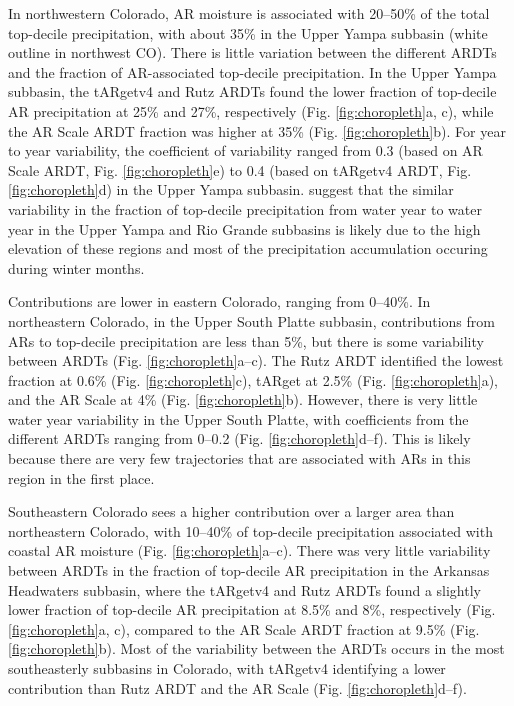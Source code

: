 \documentclass[draft]{agujournal2019}
\begin{document}
In northwestern Colorado, AR moisture is associated with 20--50\% of the total top-decile precipitation, with about 35\% in the Upper Yampa subbasin (white outline in northwest CO). There is little variation between the different ARDTs and the fraction of AR-associated top-decile precipitation. In the Upper Yampa subbasin, the tARgetv4 and Rutz ARDTs found the lower fraction of top-decile AR precipitation at 25\% and 27\%, respectively (Fig. \ref{fig:choropleth}a, c), while the AR Scale ARDT fraction was higher at 35\% (Fig. \ref{fig:choropleth}b). For year to year variability, the coefficient of variability ranged from 0.3 (based on AR Scale ARDT, Fig. \ref{fig:choropleth}e) to 0.4 (based on tARgetv4 ARDT, Fig. \ref{fig:choropleth}d) in the Upper Yampa subbasin.  suggest that the similar variability in the fraction of top-decile precipitation from water year to water year in the Upper Yampa and Rio Grande subbasins is likely due to the high elevation of these regions and most of the precipitation accumulation occuring during winter months. 

Contributions are lower in eastern Colorado, ranging from 0--40\%. In northeastern Colorado, in the Upper South Platte subbasin, contributions from ARs to top-decile precipitation are less than 5\%, but there is some variability between ARDTs (Fig. \ref{fig:choropleth}a--c). The Rutz ARDT identified the lowest fraction at 0.6\% (Fig. \ref{fig:choropleth}c), tARget at 2.5\% (Fig. \ref{fig:choropleth}a), and the AR Scale at 4\% (Fig. \ref{fig:choropleth}b). However, there is very little water year variability in the Upper South Platte, with coefficients from the different ARDTs ranging from 0--0.2 (Fig. \ref{fig:choropleth}d--f). This is likely because there are very few trajectories that are associated with ARs in this region in the first place. 

Southeastern Colorado sees a higher contribution over a larger area than northeastern Colorado, with 10--40\% of top-decile precipitation associated with coastal AR moisture (Fig. \ref{fig:choropleth}a--c). There was very little variability between ARDTs in the fraction of top-decile AR precipitation in the Arkansas Headwaters subbasin, where the tARgetv4 and Rutz ARDTs found a slightly lower fraction of top-decile AR precipitation at 8.5\% and 8\%, respectively (Fig. \ref{fig:choropleth}a, c), compared to the AR Scale ARDT fraction at 9.5\% (Fig. \ref{fig:choropleth}b). Most of the variability between the ARDTs occurs in the most southeasterly subbasins in Colorado, with tARgetv4 identifying a lower contribution than Rutz ARDT and the AR Scale (Fig. \ref{fig:choropleth}d--f).
\end{document}
